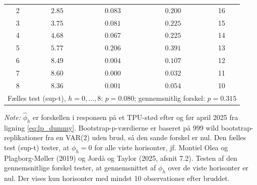 \begin{table}[H]
\begin{threeparttable}
\begin{tabular}{c cccc}
2 & $2.85$ & $0.083$ & $0.200$ & 16 \\
3 & $3.75$ & $0.081$ & $0.225$ & 15 \\
4 & $4.68$ & $0.067$ & $0.225$ & 14 \\
5 & $5.77$ & $0.206$ & $0.391$ & 13 \\
6 & $8.49$ & $0.004$ & $0.107$ & 12 \\
7 & $8.60$ & $0.000$ & $0.032$ & 11 \\
8 & $8.36$ & $0.001$ & $0.054$ & 10 \\
\multicolumn{5}{l}{Fælles test (sup-t), $h=0,\dots,8$: $p = 0.080$; gennemsnitlig forskel: $p = 0.315$} \\
\bottomrule
\end{tabular}
\begin{tablenotes}[flushleft]\footnotesize
\item \textit{Note:} $\hat\phi_h$ er forskellen i responsen på et TPU-stød efter og før
april 2025 fra ligning \eqref{eq:lp_dummy}. Bootstrap-p-værdierne er baseret på 999
wild bootstrap-replikationer fra en VAR(2) uden brud, så den sande forskel er nul.
Den fælles test (sup-t) tester, at $\phi_h=0$ for alle viste horisonter, jf. Montiel Olea
og Plagborg-Møller (2019) og Jordà og Taylor (2025, afsnit 7.2). Testen af den
gennemsnitlige forskel tester, at gennemsnittet af $\phi_h$ over de viste horisonter er nul.
Der vises kun horisonter med mindst 10 observationer efter bruddet.
\end{tablenotes}
\end{threeparttable}
\end{table}
